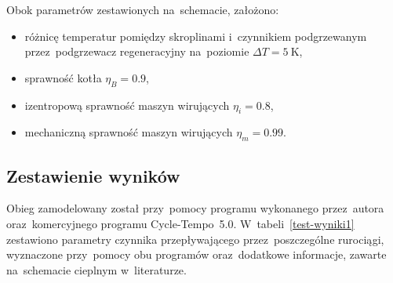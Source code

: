 Obok parametrów zestawionych na~schemacie, założono:

\begin{itemize}
	\item różnicę temperatur pomiędzy skroplinami i~czynnikiem
		podgrzewanym przez~podgrzewacz regeneracyjny na~poziomie
		$\Delta T = \SI{5}{\kelvin}$,
	\item sprawność kotła $\eta_B = \num{0,9}$,
	\item izentropową sprawność maszyn wirujących $\eta_i = \num{0,8}$,
	\item mechaniczną sprawność maszyn wirujących $\eta_m = \num{0,99}$.
\end{itemize}


\subsection{Zestawienie wyników}

Obieg zamodelowany został przy~pomocy programu wykonanego przez~autora
oraz~komercyjnego programu Cycle-Tempo~5.0. W~tabeli~\ref{test-wyniki1}
zestawiono parametry czynnika przepływającego przez~poszczególne
rurociągi, wyznaczone przy~pomocy obu programów oraz~dodatkowe
informacje, zawarte na~schemacie cieplnym w~literaturze.

